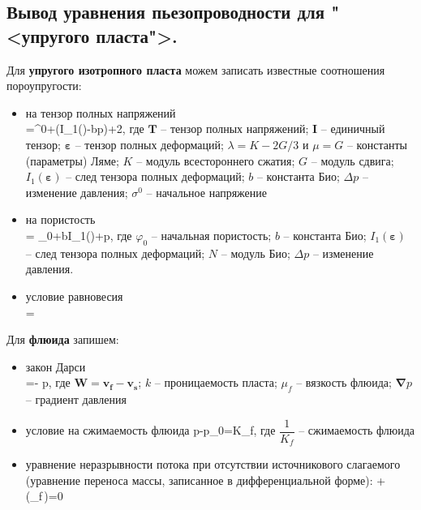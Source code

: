 

\subsection{Вывод уравнения пьезопроводности для "<упругого пласта">.}

Для \textbf{упругого изотропного пласта} можем записать известные соотношения пороупругости:
\begin{itemize}[parsep=-5pt]
\item на тензор полных напряжений \\
\beq
{}=\sigma^0+\left(\lambda I_1(\pmb{\varepsilon})-b\Delta p\right)+2\mu\pmb{\varepsilon},
\eeq
где $\pmb{T}$ -- тензор полных напряжений; $\pmb{I}$ -- единичный тензор; $\pmb{\varepsilon}$ -- тензор полных деформаций; $\lambda=K-2G/3$ и $\mu=G$ -- константы (параметры) Ляме; $K$ -- модуль всестороннего сжатия; $G$ -- модуль сдвига; $I_1(\pmb{\varepsilon})$ -- след тензора полных деформаций; $b$ -- константа Био; $\Delta p$ -- изменение давления; $\sigma^0$ -- начальное напряжение
\item на пористость \\
\beq
\varphi = \varphi_0+bI_1(\pmb{\varepsilon})+\Delta p,
\eeq
где $\varphi_0$ -- начальная пористость; $b$ -- константа Био; $I_1(\pmb{\varepsilon})$ -- след тензора полных деформаций; $N$ -- модуль Био; $\Delta p$ -- изменение давления.
\item условие равновесия \\
\beq
\pmb{\nabla}\cdot{}=
\eeq
\end{itemize}

Для \textbf{флюида} запишем:
\begin{itemize}[parsep=-5pt]
	\item закон Дарси \\
	\beq
	=-\cdot\pmb{\nabla} p,
	\eeq
	где $\pmb{W}=\pmb{v_f}-\pmb{v_s}$; $k$ -- проницаемость пласта; $\mu_f$ -- вязкость флюида; $\pmb{\nabla} p$ -- градиент давления
	\item условие на сжимаемость флюида
	\beq
	p-p_0=K_f,
	\eeq
	где $\dfrac{1}{K_f}$ -- сжимаемость флюида
	\item уравнение неразрывности потока при отсутствии источникового слагаемого (уравнение переноса массы, записанное в дифференциальной форме):
	\beq
	+\pmb{\nabla}\cdot\left(\rho_f\varphi\,\right)=0
	\eeq
\end{itemize}


